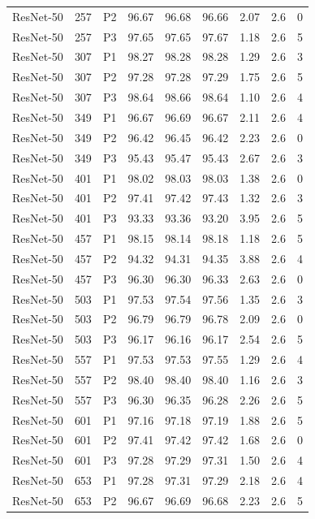 {\begin{longtable}{lrlrrrrrr}
ResNet-50 & 257 & P2 & 96.67 & 96.68 & 96.66 & 2.07 & 2.6 & 0 \\
ResNet-50 & 257 & P3 & 97.65 & 97.65 & 97.67 & 1.18 & 2.6 & 5 \\
ResNet-50 & 307 & P1 & 98.27 & 98.28 & 98.28 & 1.29 & 2.6 & 3 \\
ResNet-50 & 307 & P2 & 97.28 & 97.28 & 97.29 & 1.75 & 2.6 & 5 \\
ResNet-50 & 307 & P3 & 98.64 & 98.66 & 98.64 & 1.10 & 2.6 & 4 \\
ResNet-50 & 349 & P1 & 96.67 & 96.69 & 96.67 & 2.11 & 2.6 & 4 \\
ResNet-50 & 349 & P2 & 96.42 & 96.45 & 96.42 & 2.23 & 2.6 & 0 \\
ResNet-50 & 349 & P3 & 95.43 & 95.47 & 95.43 & 2.67 & 2.6 & 3 \\
ResNet-50 & 401 & P1 & 98.02 & 98.03 & 98.03 & 1.38 & 2.6 & 0 \\
ResNet-50 & 401 & P2 & 97.41 & 97.42 & 97.43 & 1.32 & 2.6 & 3 \\
ResNet-50 & 401 & P3 & 93.33 & 93.36 & 93.20 & 3.95 & 2.6 & 5 \\
ResNet-50 & 457 & P1 & 98.15 & 98.14 & 98.18 & 1.18 & 2.6 & 5 \\
ResNet-50 & 457 & P2 & 94.32 & 94.31 & 94.35 & 3.88 & 2.6 & 4 \\
ResNet-50 & 457 & P3 & 96.30 & 96.30 & 96.33 & 2.63 & 2.6 & 0 \\
ResNet-50 & 503 & P1 & 97.53 & 97.54 & 97.56 & 1.35 & 2.6 & 3 \\
ResNet-50 & 503 & P2 & 96.79 & 96.79 & 96.78 & 2.09 & 2.6 & 0 \\
ResNet-50 & 503 & P3 & 96.17 & 96.16 & 96.17 & 2.54 & 2.6 & 5 \\
ResNet-50 & 557 & P1 & 97.53 & 97.53 & 97.55 & 1.29 & 2.6 & 4 \\
ResNet-50 & 557 & P2 & 98.40 & 98.40 & 98.40 & 1.16 & 2.6 & 3 \\
ResNet-50 & 557 & P3 & 96.30 & 96.35 & 96.28 & 2.26 & 2.6 & 5 \\
ResNet-50 & 601 & P1 & 97.16 & 97.18 & 97.19 & 1.88 & 2.6 & 5 \\
ResNet-50 & 601 & P2 & 97.41 & 97.42 & 97.42 & 1.68 & 2.6 & 0 \\
ResNet-50 & 601 & P3 & 97.28 & 97.29 & 97.31 & 1.50 & 2.6 & 4 \\
ResNet-50 & 653 & P1 & 97.28 & 97.31 & 97.29 & 2.18 & 2.6 & 4 \\
ResNet-50 & 653 & P2 & 96.67 & 96.69 & 96.68 & 2.23 & 2.6 & 5 \\

\end{longtable}}
